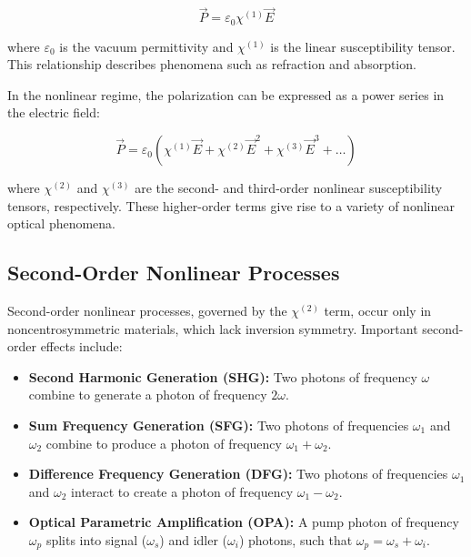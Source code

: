 \begin{equation}
	\vec{P} = \varepsilon_0 \chi^{(1)} \vec{E}
	\label{eq:linear_polarization}
\end{equation}

\noindent where $\varepsilon_0$ is the vacuum permittivity and $\chi^{(1)}$ is the linear susceptibility tensor. This relationship describes phenomena such as refraction and absorption.

\noindent In the nonlinear regime, the polarization can be expressed as a power series in the electric field:

\begin{equation}
	\vec{P} = \varepsilon_0 (\chi^{(1)} \vec{E} + \chi^{(2)} \vec{E}^2 + \chi^{(3)} \vec{E}^3 + \ldots)
	\label{eq:nonlinear_polarization}
\end{equation}

\noindent where $\chi^{(2)}$ and $\chi^{(3)}$ are the second- and third-order nonlinear susceptibility tensors, respectively. These higher-order terms give rise to a variety of nonlinear optical phenomena.

\subsection{Second-Order Nonlinear Processes}
\label{subsec:second_order}

\noindent Second-order nonlinear processes, governed by the $\chi^{(2)}$ term, occur only in noncentrosymmetric materials, which lack inversion symmetry. Important second-order effects include:

\begin{itemize}
	\item \textbf{Second Harmonic Generation (SHG):} Two photons of frequency $\omega$ combine to generate a photon of frequency $2\omega$.
	\item \textbf{Sum Frequency Generation (SFG):} Two photons of frequencies $\omega_1$ and $\omega_2$ combine to produce a photon of frequency $\omega_1 + \omega_2$.
	\item \textbf{Difference Frequency Generation (DFG):} Two photons of frequencies $\omega_1$ and $\omega_2$ interact to create a photon of frequency $\omega_1 - \omega_2$.
	\item \textbf{Optical Parametric Amplification (OPA):} A pump photon of frequency $\omega_p$ splits into signal ($\omega_s$) and idler ($\omega_i$) photons, such that $\omega_p = \omega_s + \omega_i$.
\end{itemize}

